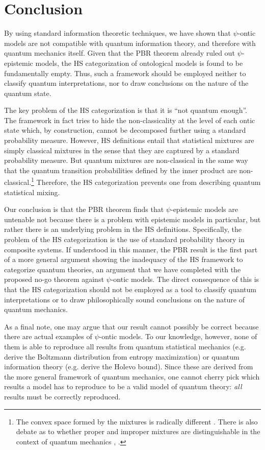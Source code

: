 \documentclass[10pt,twocolumn, nofootinbib]{revtex4-2}
\begin{document}
\section{Conclusion}

By using standard information theoretic techniques, we have shown that $\psi$-ontic models are not compatible with quantum information theory, and therefore with quantum mechanics itself. Given that the PBR theorem already ruled out $\psi$-epistemic models, the HS categorization of ontological models is found to be fundamentally empty. Thus, such a framework should be employed neither to classify quantum interpretations, nor to draw conclusions on the nature of the quantum state.

The key problem of the HS categorization is that it is ``not quantum enough''. The framework in fact tries to hide the non-classicality at the level of each ontic state which, by construction, cannot be decomposed further using a standard probability measure. However, HS definitions entail that statistical mixtures are simply classical mixtures in the sense that they are captured by a standard probability measure. But quantum mixtures are non-classical in the same way that the quantum transition probabilities defined by the inner product are non-classical.\footnote{The convex space formed by the mixtures is radically different \cite{Bengtsson:2017}. There is also debate as to whether proper and improper mixtures are distinguishable in the context of quantum mechanics \cite{Kirkpatrick:2001}, \cite{DEspagnat:2001}.} Therefore, the HS categorization prevents one from describing quantum statistical mixing.

Our conclusion is that the PBR theorem finds that $\psi$-epistemic models are untenable not because there is a problem with epistemic models in particular, but rather there is an underlying problem in the HS definitions. Specifically, the problem of the HS categorization is the use of standard probability theory in composite systems. If understood in this manner, the PBR result is the first part of a more general argument showing the inadequacy of the HS framework to categorize quantum theories, an argument that we have completed with the proposed no-go theorem against $\psi$-ontic models. The direct consequence of this is that the HS categorization should not be employed as a tool to classify quantum interpretations or to draw philosophically sound conclusions on the nature of quantum mechanics.

As a final note, one may argue that our result cannot possibly be correct because there are actual examples of $\psi$-ontic models. To our knowledge, however, none of them is able to reproduce all results from quantum statistical mechanics (e.g. derive the Boltzmann distribution from entropy maximization) or quantum information theory (e.g. derive the Holevo bound). Since these are derived from the more general framework of quantum mechanics, one cannot cherry pick which results a model has to reproduce to be a valid model of quantum theory: \emph{all} results must be correctly reproduced.
\end{document}
